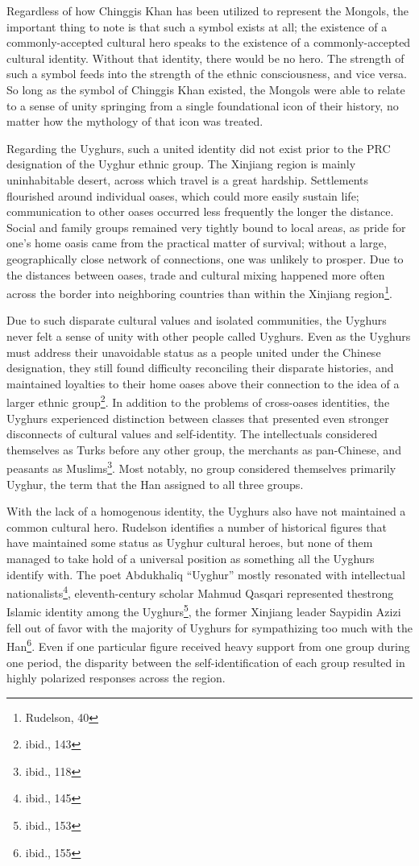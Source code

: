 Regardless of how Chinggis Khan has been utilized to represent the Mongols, the
important thing to note is that such a symbol exists at all; the existence of a
commonly-accepted cultural hero speaks to the existence of a commonly-accepted
cultural identity. Without that identity, there would be no hero. The strength
of such a symbol feeds into the strength of the ethnic consciousness, and vice
versa. So long as the symbol of Chinggis Khan existed, the Mongols were able to
relate to a sense of unity springing from a single foundational icon of their
history, no matter how the mythology of that icon was treated.

Regarding the Uyghurs, such a united identity did not exist prior to the PRC
designation of the Uyghur ethnic group. The Xinjiang region is mainly
uninhabitable desert, across which travel is a great hardship.  Settlements
flourished around individual oases, which could more easily sustain life;
communication to other oases occurred less frequently the longer the distance.
Social and family groups remained very tightly bound to local areas, as pride
for one's home oasis came from the practical matter of survival; without a
large, geographically close network of connections, one was unlikely to prosper.
Due to the distances between oases, trade and cultural mixing happened more
often across the border into neighboring countries than within the Xinjiang
region\footnote{Rudelson, 40}.

Due to such disparate cultural values and isolated communities, the Uyghurs
never felt a sense of unity with other people called Uyghurs. Even as the
Uyghurs must address their unavoidable status as a people united under the
Chinese designation, they still found difficulty reconciling their disparate
histories, and maintained loyalties to their home oases above their connection
to the idea of a larger ethnic group\footnote{ibid., 143}. In addition to the
problems of cross-oases identities, the Uyghurs experienced distinction between
classes that presented even stronger disconnects of cultural values and
self-identity. The intellectuals considered themselves as Turks before any other
group, the merchants as pan-Chinese, and peasants as Muslims\footnote{ibid.,
118}. Most notably, no group considered themselves primarily Uyghur, the term
that the Han assigned to all three groups.

With the lack of a homogenous identity, the Uyghurs also have not maintained a
common cultural hero. Rudelson identifies a number of historical figures that
have maintained some status as Uyghur cultural heroes, but none of them managed
to take hold of a universal position as something all the Uyghurs identify with.
The poet Abdukhaliq ``Uyghur'' mostly resonated with intellectual
nationalists\footnote{ibid., 145}, eleventh-century scholar Mahmud Qasqari
represented thestrong Islamic identity among the Uyghurs\footnote{ibid.,
153}, the former Xinjiang leader Saypidin Azizi fell out of favor with the
majority of Uyghurs for sympathizing too much with the Han\footnote{ibid., 155}.
Even if one particular figure received heavy support from one group during one
period, the disparity between the self-identification of each group resulted in
highly polarized responses across the region.


